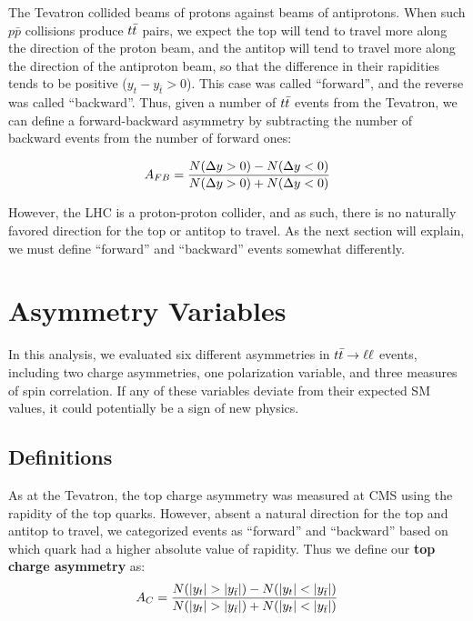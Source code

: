 The Tevatron collided beams of protons against beams of
antiprotons. When such $p\bar{p}$ collisions produce
$t\bar{t}$ pairs, we expect the top will tend to travel more along the direction
of the proton beam, and the antitop will tend to travel
more along the direction of the antiproton beam, so that the
difference in their rapidities tends to be positive ($y_t - y_{\bar{t}} > 0$).
This case was called ``forward'', and the reverse was called
``backward''. Thus, given a number of $t\bar{t}$
events from the Tevatron, we can define a forward-backward
asymmetry by subtracting the number of backward events from the number
of forward ones:

\begin{equation}
A_{FB} = \frac{N(\Delta y>0) - N(\Delta y<0)}{N(\Delta y>0) + N(\Delta y<0)}
\end{equation}

However, the LHC is a proton-proton collider, and as such, there is no
naturally favored direction for the top or antitop to travel. As the
next section will explain, we must define ``forward'' and ``backward''
events somewhat differently.

\section{Asymmetry Variables}
\label{sec:afb:variables}

In this analysis, we evaluated six different asymmetries in $t\bar{t} \rightarrow \ell\ell$
events, including two charge asymmetries, one polarization variable,
and three measures of spin correlation. If any of these
variables deviate from their expected SM values, it could potentially
be a sign of new physics.

\subsection{Definitions}
\label{ssec:afb:variables}

As at the Tevatron, the top charge asymmetry was measured at CMS using
the rapidity of the top quarks. However, absent a natural direction
for the top and antitop to travel, we categorized events as
``forward'' and ``backward'' based on which quark had a higher
absolute value of rapidity. Thus we define our \textbf{top charge
asymmetry} as:
\begin{equation}
A_C = \asymmetry{|y_t|}{|y_{\bar{t}}|}
\label{eq:afb:topchargeasym}
\end{equation}

